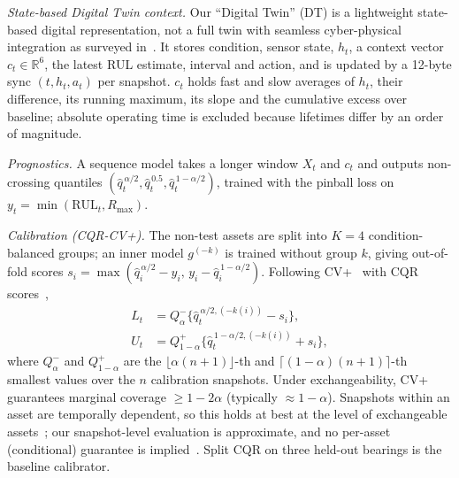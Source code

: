 \documentclass[conference]{IEEEtran}
\begin{document}
\textit{State-based Digital Twin context.} Our ``Digital Twin'' (DT) is a lightweight state-based digital representation, not a full twin with seamless cyber-physical integration as surveyed in~\cite{tao2019dt}. It stores condition, sensor state, $h_t$, a context vector $c_t\in\mathbb{R}^6$, the latest RUL estimate, interval and action, and is updated by a 12-byte sync $(t,h_t,a_t)$ per snapshot. $c_t$ holds fast and slow averages of $h_t$, their difference, its running maximum, its slope and the cumulative excess over baseline; absolute operating time is excluded because lifetimes differ by an order of magnitude.

\textit{Prognostics.} A sequence model takes a longer window $X_t$ and $c_t$ and outputs non-crossing quantiles $(\hat q^{\,\alpha/2}_t,\hat q^{\,0.5}_t,\hat q^{\,1-\alpha/2}_t)$, trained with the pinball loss on $y_t=\min(\mathrm{RUL}_t,R_{\max})$.

\textit{Calibration (CQR-CV+).} The non-test assets are split into $K{=}4$ condition-balanced groups; an inner model $g^{(-k)}$ is trained without group $k$, giving out-of-fold scores $s_i=\max(\hat q^{\,\alpha/2}_i-y_i,\,y_i-\hat q^{\,1-\alpha/2}_i)$. Following CV+~\cite{barber2021jackknife} with CQR scores~\cite{romano2019cqr},
\begin{align}
L_t&=Q^{-}_{\alpha}\{\hat q^{\,\alpha/2,(-k(i))}_t-s_i\},\\
U_t&=Q^{+}_{1-\alpha}\{\hat q^{\,1-\alpha/2,(-k(i))}_t+s_i\},
\end{align}
where $Q^{-}_{\alpha}$ and $Q^{+}_{1-\alpha}$ are the $\lfloor\alpha(n{+}1)\rfloor$-th and $\lceil(1{-}\alpha)(n{+}1)\rceil$-th smallest values over the $n$ calibration snapshots. Under exchangeability, CV+ guarantees marginal coverage $\ge1-2\alpha$ (typically $\approx1-\alpha$). Snapshots within an asset are temporally dependent, so this holds at best at the level of exchangeable assets~\cite{dunn2023hierarchical}; our snapshot-level evaluation is approximate, and no per-asset (conditional) guarantee is implied~\cite{foygel2021limits}. Split CQR on three held-out bearings is the baseline calibrator.
\end{document}
